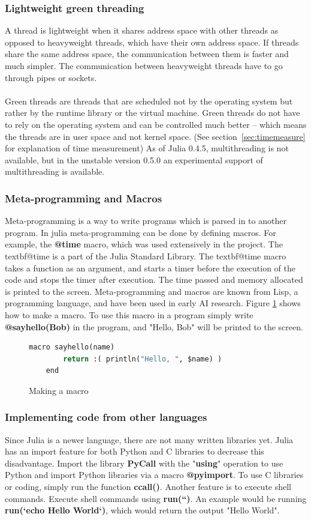\documentclass[a4paper, 11pt, titlepage]{article}
\begin{document}
\subsubsection{Lightweight green threading}
A thread is lightweight when it shares address space with other threads as opposed to heavyweight threads, which have their own address space. If threads share the same address space, the communication between them is faster and much simpler. The communication between heavyweight threads have to go through pipes or sockets. \\
\\
Green threads are threads that are scheduled not by the operating system but rather by the runtime library or the virtual machine. Green threads do not have to rely on the operating system and can be controlled much better – which means the threads are in user space and not kernel space. (See section~\ref{sec:timemeasure} for explanation of time measurement) As of Julia 0.4.5, multithreading is not available, but in the unstable version 0.5.0 an experimental support of multithreading is available. 

\subsubsection{Meta-programming and Macros}
Meta-programming is a way to write programs which is parsed in to another program. In julia meta-programming can be done by defining macros. For example, the \textbf{@time} macro, which was used extensively in the project. The textbf{@time} is a part of the Julia Standard Library. The textbf{@time} macro takes a function as an argument, and starts a timer before the execution of the code and stops the timer after execution. The time passed and memory allocated is printed to the screen.  Meta-programming and macros are known from Lisp, a programming language, and have been used in early AI research. Figure \ref{macro} shows how to make a macro. To use this macro in a program simply write \textbf{@sayhello(Bob)} in the program, and "Hello, Bob" will be printed to the screen.
\begin{figure}[H]
	\begin{lstlisting}[language=python]
	macro sayhello(name)
		return :( println("Hello, ", $name) )
	end
	\end{lstlisting}
	\caption{Making a macro}
	\label{macro}
\end{figure}

\subsubsection{Implementing code from other languages}
Since Julia is a newer language, there are not many written libraries yet. Julia has an import feature for both Python and C libraries to decrease this disadvantage. Import the library \textbf{PyCall} with the "\textbf{using}" operation to use Python and import Python libraries via a macro \textbf{@pyimport}. To use C libraries or coding, simply run the function \textbf{ccall()}. Another feature is to execute shell commands. Execute shell commands using \textbf{run(``)}. An example would be running \textbf{run(`echo Hello World`)}, which would return the output "Hello World".
\end{document}
